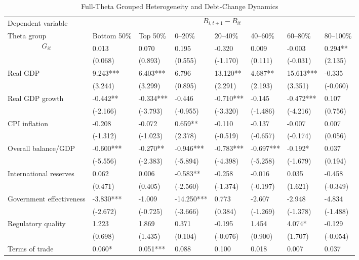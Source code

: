 \begin{table}[H]\centering
\begin{threeparttable}
\caption{Full-Theta Grouped Heterogeneity and Debt-Change Dynamics}
\label{tab:theta_group_heterogeneity_debt}
\scriptsize
\begin{tabularx}{\textwidth}{lYYYYYYY}
\toprule
Dependent variable &  \\
\cmidrule(lr){2-8}
Theta group & Bottom 50\% & Top 50\% & 0--20\% & 20--40\% & 40--60\% & 60--80\% & 80--100\% \\
\midrule
$$G_{it}$$ & 0.013 & 0.070 & 0.195 & -0.320 & 0.009 & -0.003 & 0.294** \\
  & (0.068) & (0.893) & (0.555) & (-1.170) & (0.111) & (-0.031) & (2.135) \\
Real GDP & 9.243*** & 6.403*** & 6.796 & 13.120** & 4.687** & 15.613*** & -0.335 \\
  & (3.244) & (3.299) & (0.895) & (2.291) & (2.193) & (3.351) & (-0.060) \\
Real GDP growth & -0.442** & -0.334*** & -0.446 & -0.710*** & -0.145 & -0.472*** & 0.107 \\
  & (-2.166) & (-3.793) & (-0.955) & (-3.320) & (-1.486) & (-4.216) & (0.756) \\
CPI inflation & -0.208 & -0.072 & 0.659** & -0.110 & -0.137 & -0.007 & 0.007 \\
  & (-1.312) & (-1.023) & (2.378) & (-0.519) & (-0.657) & (-0.174) & (0.056) \\
Overall balance/GDP & -0.600*** & -0.270** & -0.946*** & -0.783*** & -0.697*** & -0.192* & 0.037 \\
  & (-5.556) & (-2.383) & (-5.894) & (-4.398) & (-5.258) & (-1.679) & (0.194) \\
International reserves & 0.062 & 0.006 & -0.583** & -0.258 & -0.016 & 0.035 & -0.458 \\
  & (0.471) & (0.405) & (-2.560) & (-1.374) & (-0.197) & (1.621) & (-0.349) \\
Government effectiveness & -3.830*** & -1.009 & -14.250*** & 0.773 & -2.607 & -2.948 & -4.834 \\
  & (-2.672) & (-0.725) & (-3.666) & (0.384) & (-1.269) & (-1.378) & (-1.488) \\
Regulatory quality & 1.223 & 1.869 & 0.371 & -0.195 & 1.454 & 4.074* & -0.129 \\
  & (0.698) & (1.435) & (0.104) & (-0.076) & (0.900) & (1.707) & (-0.054) \\
Terms of trade & 0.060* & 0.051*** & 0.088 & 0.100 & 0.018 & 0.007 & 0.037 \\

\end{tabularx}
\end{threeparttable}
\end{table}
